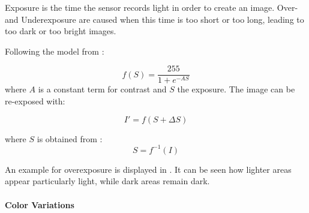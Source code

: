 Exposure is the time the sensor records light in order to create an image. Over- and Underexposure are caused when this time is too short or too long, leading to too dark or too bright images.

Following the model from \cite{Carlson2018}:

\begin{equation}
f(S) = \frac{255}{1 + e^{-A S}}
\end{equation}
where $A$ is a constant term for contrast and $S$ the exposure.
The image can be re-exposed with:

\begin{equation}
I' = f(S+\Delta S)
\end{equation}

where $S$ is obtained from :
\begin{equation}
S = f^{-1}(I)
\end{equation}

An example for overexposure is displayed in . It can be seen how lighter areas appear particularly light, while dark areas remain dark.

\paragraph{Color Variations}



